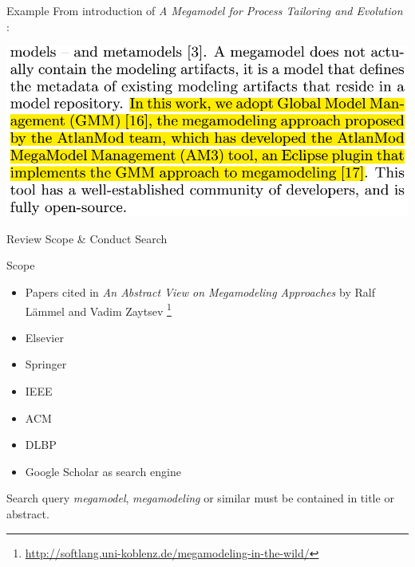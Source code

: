 \documentclass{beamer}
\begin{document}
\begin{frame}{Example}
From introduction of \textit{A Megamodel for Process Tailoring and Evolution} \cite{tailoring}:
\begin{center}
\includegraphics[width=1.0\textwidth]{ex_rq4}
\end{center}
\end{frame}

\begin{frame}{Review Scope \& Conduct Search}

\begin{block}{Scope}
\begin{itemize}
	\item Papers cited in \textit{An Abstract View on Megamodeling Approaches} by Ralf Lämmel and Vadim Zaytsev \footnote{\url{http://softlang.uni-koblenz.de/megamodeling-in-the-wild/}}
	\item Elsevier
	\item Springer
	\item IEEE
	\item ACM
	\item DLBP
	\item Google Scholar as search engine
\end{itemize}
\end{block}

\begin{block}{Search query}
\textit{megamodel}, \textit{megamodeling} or similar must be contained in title or abstract.
\end{block}

\end{frame}
\end{document}
